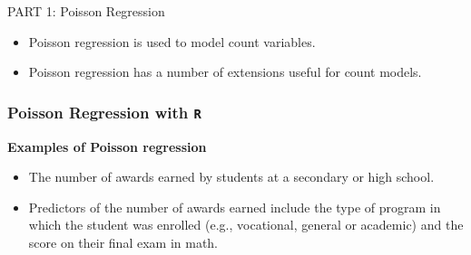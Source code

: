 \documentclass[MASTER.tex]{subfiles}
\begin{document}
%
 
\begin{frame}
	
	{\LARGE
	PART 1:	Poisson Regression
	} \bigskip
	\Large
	\begin{itemize}
		\item Poisson regression is used to model count variables.
		\item Poisson regression has a number of extensions useful for count models.

	\end{itemize}
\end{frame}




% 

%

\begin{frame}[fragile]

\frametitle{Poisson Regression with \texttt{R} } 
 
 \Large	
 
 \textbf{Examples of Poisson regression} \\
 	
 \begin{itemize}	
 \item The number of awards earned by students at a secondary or high school. 
 \item Predictors of the number of awards earned include the type of program in which the student was enrolled (e.g., vocational, general or academic) and the score on their final exam in math.
 \end{itemize}
 
\end{frame}
\end{document}
